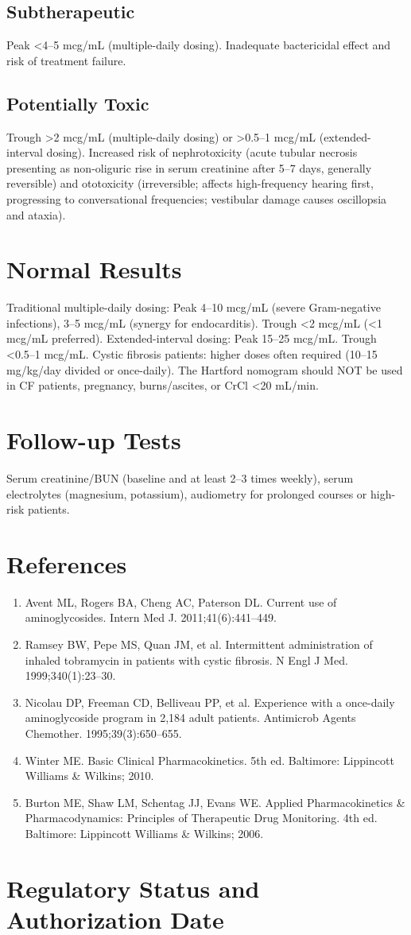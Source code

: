 \subsection*{Subtherapeutic}
Peak <4--5 mcg/mL (multiple-daily dosing). Inadequate bactericidal effect and risk of treatment failure.

\subsection*{Potentially Toxic}
Trough >2 mcg/mL (multiple-daily dosing) or >0.5--1 mcg/mL (extended-interval dosing). Increased risk of nephrotoxicity (acute tubular necrosis presenting as non-oliguric rise in serum creatinine after 5--7 days, generally reversible) and ototoxicity (irreversible; affects high-frequency hearing first, progressing to conversational frequencies; vestibular damage causes oscillopsia and ataxia).

\section*{Normal Results}
Traditional multiple-daily dosing: Peak 4--10 mcg/mL (severe Gram-negative infections), 3--5 mcg/mL (synergy for endocarditis). Trough <2 mcg/mL (<1 mcg/mL preferred). Extended-interval dosing: Peak 15--25 mcg/mL. Trough <0.5--1 mcg/mL. Cystic fibrosis patients: higher doses often required (10--15 mg/kg/day divided or once-daily). The Hartford nomogram should NOT be used in CF patients, pregnancy, burns/ascites, or CrCl <20 mL/min.

\section*{Follow-up Tests}
Serum creatinine/BUN (baseline and at least 2--3 times weekly), serum electrolytes (magnesium, potassium), audiometry for prolonged courses or high-risk patients.

\section*{References}
\begin{enumerate}
  \item Avent ML, Rogers BA, Cheng AC, Paterson DL. Current use of aminoglycosides. Intern Med J. 2011;41(6):441--449.
  \item Ramsey BW, Pepe MS, Quan JM, et al. Intermittent administration of inhaled tobramycin in patients with cystic fibrosis. N Engl J Med. 1999;340(1):23--30.
  \item Nicolau DP, Freeman CD, Belliveau PP, et al. Experience with a once-daily aminoglycoside program in 2,184 adult patients. Antimicrob Agents Chemother. 1995;39(3):650--655.
  \item Winter ME. Basic Clinical Pharmacokinetics. 5th ed. Baltimore: Lippincott Williams \& Wilkins; 2010.
  \item Burton ME, Shaw LM, Schentag JJ, Evans WE. Applied Pharmacokinetics \& Pharmacodynamics: Principles of Therapeutic Drug Monitoring. 4th ed. Baltimore: Lippincott Williams \& Wilkins; 2006.
\end{enumerate}

\clearpage
\section*{Regulatory Status and Authorization Date}

\clearpage
